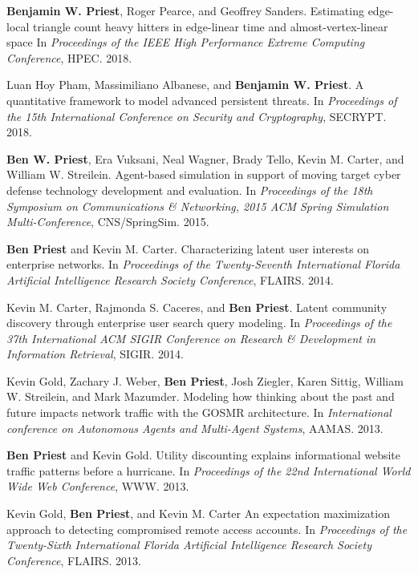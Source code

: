 \documentclass[10pt]{article}
\begin{document}
\begin{bibenum}

\item \textbf{Benjamin W. Priest}, Roger Pearce, and Geoffrey Sanders.
	Estimating edge-local triangle count heavy hitters in edge-linear time and almost-vertex-linear space
	In \emph{Proceedings of the IEEE High Performance Extreme Computing Conference}, 
	HPEC. 
	2018.

\item Luan Hoy Pham, Massimiliano Albanese, and \textbf{Benjamin W. Priest}.
	A quantitative framework to model advanced persistent threats.
	In \emph{Proceedings of the 15th International Conference on Security and Cryptography}, 
	SECRYPT. 
	2018.

\item \textbf{Ben W. Priest}, Era Vuksani, Neal Wagner, Brady Tello, Kevin M. Carter, and William W. Streilein. 
	Agent-based simulation in support of moving target cyber defense technology development and evaluation.
	In \emph{Proceedings of the 18th Symposium on Communications \& Networking, 2015 ACM Spring Simulation Multi-Conference}, 
	CNS/SpringSim. 
	2015.

\item \textbf{Ben Priest} and Kevin M. Carter.
	Characterizing latent user interests on enterprise networks.
	In \emph{Proceedings of the Twenty-Seventh International Florida Artificial Intelligence Research Society Conference}, 
	FLAIRS. 
	2014.

\item Kevin M. Carter, Rajmonda S. Caceres, and \textbf{Ben Priest}.
	Latent community discovery through enterprise user search query modeling.
	In \emph{Proceedings of the 37th International ACM SIGIR Conference on Research \& Development in Information Retrieval}, 
	SIGIR. 
	2014.

\item Kevin Gold, Zachary J. Weber, \textbf{Ben Priest}, Josh Ziegler, Karen Sittig, William W. Streilein, and Mark Mazumder.
	Modeling how thinking about the past and future impacts network traffic with the GOSMR architecture.
	In \emph{International conference on Autonomous Agents and Multi-Agent Systems}, 
	AAMAS. 
	2013.

\item \textbf{Ben Priest} and Kevin Gold.
	Utility discounting explains informational website traffic patterns before a hurricane.
	In \emph{Proceedings of the 22nd International World Wide Web Conference}, 
	WWW. 
	2013.

\item Kevin Gold, \textbf{Ben Priest}, and Kevin M. Carter
	An expectation maximization approach to detecting compromised remote access accounts.
	In \emph{Proceedings of the Twenty-Sixth International Florida Artificial Intelligence Research Society Conference}, 
	FLAIRS. 
	2013.

\end{bibenum}
\end{document}
